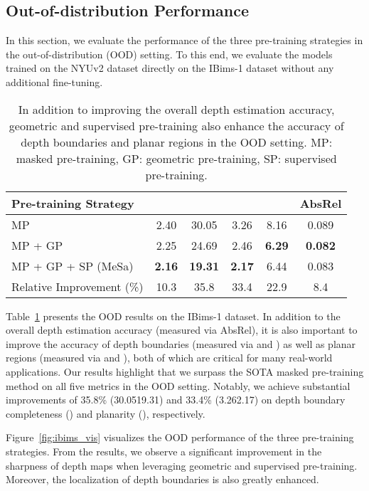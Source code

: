 \subsection{Out-of-distribution Performance}
\label{sec:ood}
In this section, we evaluate the performance of the three pre-training strategies in the out-of-distribution (OOD) setting. To this end, we evaluate the models trained on the NYUv2 dataset directly on the IBims-1 dataset without any additional fine-tuning.
\begin{table}[b]
\caption{In addition to improving the overall depth estimation accuracy, geometric and supervised pre-training also enhance the accuracy of depth boundaries and planar regions in the OOD setting. MP: masked pre-training, GP: geometric pre-training, SP: supervised pre-training.}
\label{table:ibims}
\centering
\begin{tabular}{lccccc}
\toprule Pre-training Strategy &  &  &  &  & AbsRel  \\
\midrule
MP~\citep{xie2022revealing} & 2.40 & 30.05 & 3.26 & 8.16 & 0.089 \\
MP + GP & 2.25 & 24.69 & 2.46 & \textbf{6.29} & \textbf{0.082} \\
MP + GP + SP (MeSa) & \textbf{2.16} & \textbf{19.31} & \textbf{2.17} & 6.44 & 0.083 \\\midrule
Relative Improvement (\%) & 10.3 & 35.8 & 33.4 & 22.9 & 8.4 \\
\bottomrule
\end{tabular}
\end{table}

Table~\ref{table:ibims} presents the OOD results on the IBims-1 dataset. In addition to the overall depth estimation accuracy (measured via AbsRel), it is also important to improve the accuracy of depth boundaries (measured via  and ) as well as planar regions (measured via  and ), both of which are critical for many real-world applications. Our results highlight that we surpass the SOTA masked pre-training method on all five metrics in the OOD setting. Notably, we achieve substantial improvements of 35.8\% (30.0519.31) and 33.4\% (3.262.17) on depth boundary completeness () and planarity (), respectively.

Figure~\ref{fig:ibims_vis} visualizes the OOD performance of the three pre-training strategies. From the results, we observe a significant improvement in the sharpness of depth maps when leveraging geometric and supervised pre-training. Moreover, the localization of depth boundaries is also greatly enhanced.
